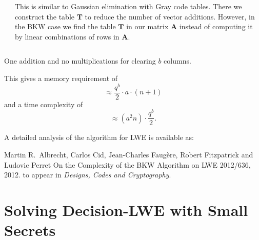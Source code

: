 \documentclass[10pt]{beamer}
\renewcommand{\vec}[1]{\mathbf{#1}\xspace}
\begin{document}
\begin{frame}
\begin{columns}
\begin{center}
\end{center}
This is similar to Gaussian elimination with Gray code tables. There we construct the table $\vec{T}$ to reduce the number of vector additions. However, in the BKW case we find the table $\vec{T}$ in our matrix $\vec{A}$ instead of computing it by linear combinations of rows in $\vec{A}$.
\end{columns}

\vspace{1em}

One addition and no multiplications for clearing $b$ columns.

\framebreak

This gives a memory requirement of $$\approx\frac{q^b}{2}\cdot a\cdot(n+1)$$ and a time complexity of $$\approx (a^2n)\cdot\frac{q^b}{2}.$$

\vspace{1em}

A detailed analysis of the algorithm for LWE is available as:

\begin{thebibliography}{foobar}
Martin R.\ Albrecht, Carlos Cid, Jean-Charles Faugère, Robert Fitzpatrick and Ludovic Perret
\newblock On the Complexity of the BKW Algorithm on LWE
 2012/636, 2012.
\newblock to appear in {\em Designs, Codes and Cryptography}.
\end{thebibliography}
\end{frame}

\section{Solving Decision-LWE with Small Secrets}
\end{document}

